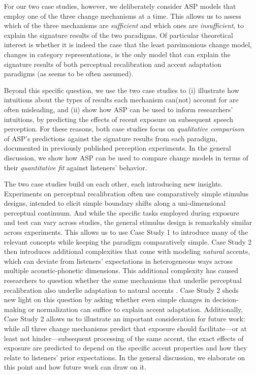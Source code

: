 \documentclass[
  11pt,
  man,floatsintext]{apa6}
\begin{document}
For our two case studies, however, we deliberately consider ASP models that employ one of the three change mechanisms at a time. This allows us to assess which of the three mechanisms are \emph{sufficient} and which ones are \emph{insufficient}, to explain the signature results of the two paradigms. Of particular theoretical interest is whether it is indeed the case that the least parsimonious change model, changes in category representations, is the only model that can explain the signature results of both perceptual recalibration and accent adaptation paradigms (as seems to be often assumed).

Beyond this specific question, we use the two case studies to (i) illustrate how intuitions about the types of results each mechanism can(not) account for are often misleading, and (ii) show how ASP can be used to inform researchers' intuitions, by predicting the effects of recent exposure on subsequent speech perception. For these reasons, both case studies focus on \emph{qualitative comparison} of ASP's predictions against the signature results from each paradigm, documented in previously published perception experiments. In the general discussion, we show how ASP can be used to compare change models in terms of their \emph{quantitative fit} against listeners' behavior.

The two case studies build on each other, each introducing new insights. Experiments on perceptual recalibration often use comparatively simple stimulus designs, intended to elicit simple boundary shifts along a uni-dimensional perceptual continuum. And while the specific tasks employed during exposure and test can vary across studies, the general stimulus design is remarkably similar across experiments. This allows us to use Case Study 1 to introduce many of the relevant concepts while keeping the paradigm comparatively simple. Case Study 2 then introduces additional complexities that come with modeling \emph{natural} accents, which can deviate from listeners' expectations in heterogeneous ways across multiple acoustic-phonetic dimensions. This additional complexity has caused researchers to question whether the same mechanisms that underlie perceptual recalibration also underlie adaptation to natural accents \autocites[see recent reviews,][]{baeseberk2018,bent-baeseberk2021,zheng-samuel2020}. Case Study 2 sheds new light on this question by asking whether even simple changes in decision-making or normalization can suffice to explain accent adaptation. Additionally, Case Study 2 allows us to illustrate an important consideration for future work: while all three change mechanisms predict that exposure should facilitate---or at least not hinder---subsequent processing of the same accent, the exact effects of exposure are predicted to depend on the specific accent properties and how they relate to listeners' prior expectations. In the general discussion, we elaborate on this point and how future work can draw on it.
\end{document}
